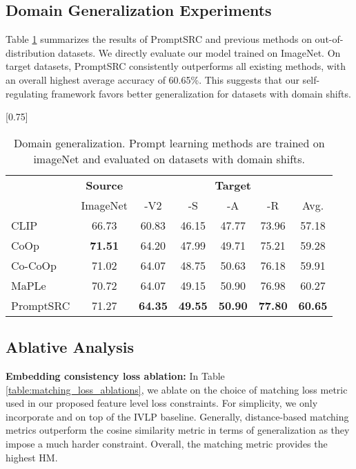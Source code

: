 \documentclass[10pt,twocolumn,letterpaper]{article}
\begin{document}
\subsection{Domain Generalization Experiments}
Table \ref{tab:robustness} summarizes the results of PromptSRC and previous methods on out-of-distribution datasets. We directly evaluate our model trained on ImageNet. On target datasets, PromptSRC consistently outperforms all existing methods, with an overall highest average accuracy of 60.65\%. This suggests that our self-regulating framework favors better generalization for datasets with domain shifts.
\begin{table}[!t]

    \small \centering
 \setlength{\tabcolsep}{8pt}
    \scalebox{0.75}[0.75]{
    \begin{tabular}{l cccccc}
    \toprule
    & \textbf{Source} & \multicolumn{5}{c}{\textbf{Target}} \\ \cmidrule(lr){2-2} \cmidrule(lr){3-7}
     & ImageNet & -V2 & -S & -A & -R  & Avg.\\
    \midrule
    CLIP &  66.73 & 60.83 & {46.15} & 47.77 & {73.96} & {57.18} \\
    CoOp &  \textbf{71.51} & {64.20} & 47.99  & 49.71  & 75.21  & {59.28} \\
    Co-CoOp & 71.02 & {64.07} & 48.75 & 50.63 & 76.18 & {59.91}  \\
        MaPLe & 70.72  & {64.07} & 49.15  & 50.90 & 76.98 & {60.27}  \\
    \midrule
    \rowcolor{tabhighlight} PromptSRC & 71.27 & \textbf{{64.35}} & \textbf{49.55} & \textbf{50.90}  & \textbf{77.80} & \textbf{60.65} \\
    \bottomrule
    \end{tabular}}\vspace{-0.5em}
        \caption{\textnormal{Domain generalization. }Prompt learning methods are trained on imageNet and evaluated on datasets with domain shifts.} 
    \label{tab:robustness}
    \vspace{-1em}
\end{table} 

\subsection{Ablative Analysis}
\label{sec:experiments:ablation_experiments}


\noindent \textbf{Embedding consistency loss ablation:}
In Table \ref{table:matching_loss_ablations}, we ablate on the choice of matching loss metric used in our proposed feature level  loss constraints. For simplicity, we only incorporate  and  on top of the IVLP baseline. Generally, distance-based matching metrics outperform the cosine similarity metric in terms of generalization as they impose a much harder constraint. Overall, the  matching metric provides the highest HM.
\end{document}
